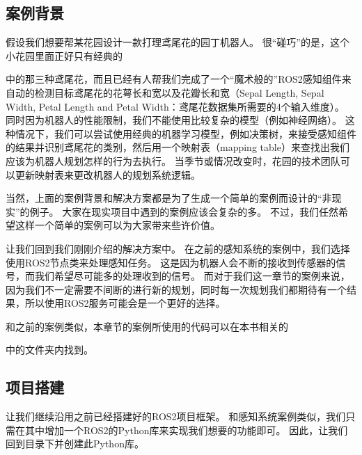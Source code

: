\documentclass[letterpaper,10pt,english]{sphinxmanual}
\begin{document}
\subsection{案例背景}
\label{\detokenize{chapter_rl_sys/planning_code_ex:id2}}
\sphinxAtStartPar
假设我们想要帮某花园设计一款打理鸢尾花的园丁机器人。
很“碰巧”的是，这个小花园里面正好只有经典的%
\begin{footnote}[97]\sphinxAtStartFootnote
{}
%
\end{footnote}中的那三种鸢尾花，而且已经有人帮我们完成了一个“魔术般的”ROS2感知组件来自动的检测目标鸢尾花的花萼长和宽以及花瓣长和宽（Sepal
Length, Sepal Width, Petal Length and Petal
Width：鸢尾花数据集所需要的4个输入维度）。
同时因为机器人的性能限制，我们不能使用比较复杂的模型（例如神经网络）。
这种情况下，我们可以尝试使用经典的机器学习模型，例如决策树，来接受感知组件的结果并识别鸢尾花的类别，然后用一个映射表（mapping
table）来查找出我们应该为机器人规划怎样的行为去执行。
当季节或情况改变时，花园的技术团队可以更新映射表来更改机器人的规划系统逻辑。

\sphinxAtStartPar
当然，上面的案例背景和解决方案都是为了生成一个简单的案例而设计的“非现实”的例子。
大家在现实项目中遇到的案例应该会复杂的多。
不过，我们任然希望这样一个简单的案例可以为大家带来些许价值。

\sphinxAtStartPar
让我们回到我们刚刚介绍的解决方案中。
在之前的感知系统的案例中，我们选择使用ROS2节点类来处理感知任务。
这是因为机器人会不断的接收到传感器的信号，而我们希望尽可能多的处理收到的信号。
而对于我们这一章节的案例来说，因为我们不一定需要不间断的进行新的规划，同时每一次规划我们都期待有一个结果，所以使用ROS2服务可能会是一个更好的选择。

\sphinxAtStartPar
和之前的案例类似，本章节的案例所使用的代码可以在本书相关的%
\begin{footnote}[98]\sphinxAtStartFootnote
{}
%
\end{footnote}中的文件夹内找到。


\subsection{项目搭建}
\label{\detokenize{chapter_rl_sys/planning_code_ex:id3}}
\sphinxAtStartPar
让我们继续沿用之前已经搭建好的ROS2项目框架。
和感知系统案例类似，我们只需在其中增加一个ROS2的Python库来实现我们想要的功能即可。
因此，让我们回到目录下并创建此Python库。
\end{document}
